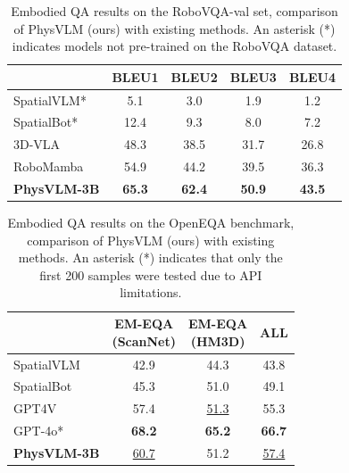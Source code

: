 \documentclass[10pt,twocolumn,letterpaper]{article}
\begin{document}
\begin{table}[ht]
\caption{Embodied QA results on the RoboVQA-val set, comparison of PhysVLM (ours) with existing methods. An asterisk (*) indicates models not pre-trained on the RoboVQA dataset.}
\label{table2}

\begin{center}
\begin{small}
\begin{sc}
\begin{tabular}{lcccc}
\toprule
 & BLEU1 & BLEU2 & BLEU3 & BLEU4 \\
\midrule
SpatialVLM* & 5.1 & 3.0 & 1.9 & 1.2  \\
SpatialBot* & 12.4 & 9.3 & 8.0 & 7.2  \\
3D-VLA     & 48.3  & 38.5  & 31.7  & 26.8   \\
RoboMamba  & 54.9  & 44.2  & 39.5  & 36.3   \\
\textbf{PhysVLM-3B} & \textbf{65.3}  & \textbf{62.4}  & \textbf{50.9}  & \textbf{43.5}   \\
\bottomrule
\end{tabular}
\end{sc}
\end{small}
\end{center}
\vskip -0.1in
\end{table}

\begin{table}[ht]
\caption{Embodied QA results on the OpenEQA benchmark, comparison of PhysVLM (ours) with existing methods. An asterisk (*) indicates that only the first 200 samples were tested due to API limitations.}
\label{table3}

\begin{center}
\begin{small}
\begin{sc}
\begin{tabular}{lccc}
\toprule
 & \makecell[l]{EM-EQA\\(ScanNet)} & \makecell[l]{EM-EQA\\(HM3D)} & ALL \\
\midrule
SpatialVLM & 42.9 & 44.3 & 43.8 \\
SpatialBot & 45.3 & 51.0 & 49.1 \\
GPT4V      & 57.4  & \underline{51.3}  & 55.3  \\
GPT-4o*     & \textbf{68.2}  & \textbf{65.2}  & \textbf{66.7} \\
\textbf{PhysVLM-3B} & \underline{60.7}  & 51.2  & \underline{57.4}  \\
\bottomrule
\end{tabular}
\end{sc}
\end{small}
\end{center}
\vskip -0.1in
\end{table}
\end{document}
